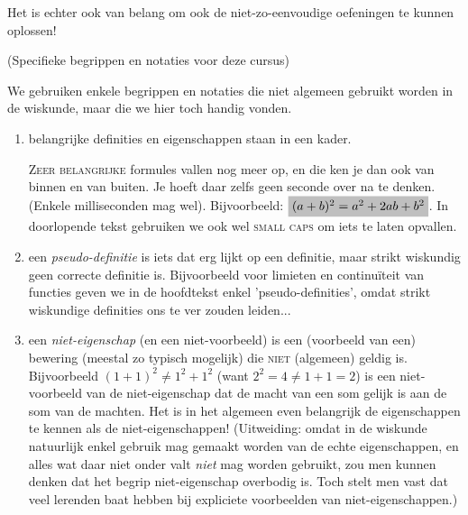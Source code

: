 \documentclass{ximera}
\begin{document}
\begin{remark}
\begin{enumerate}
		Het is echter ook van belang om ook de niet-zo-eenvoudige oefeningen te kunnen oplossen! 
		
	\end{enumerate}
\end{remark}

\begin{notation} (Specifieke begrippen en notaties voor deze cursus) 
	
	We gebruiken enkele begrippen en notaties die niet algemeen gebruikt worden in de wiskunde, maar die we hier toch handig vonden.
	\begin{enumerate}
		\item belangrijke definities en eigenschappen staan in een kader.
		
		 \textsc{Zeer belangrijke} formules vallen nog meer op, en die ken je dan ook van binnen en van buiten. Je hoeft daar zelfs geen seconde over na te denken. (Enkele milliseconden mag wel). Bijvoorbeeld: $\important{(a+b)^2 = a^2 + 2ab + b^2}$. In doorlopende tekst gebruiken we ook wel \textsc{small caps} om iets te laten opvallen.
		\item een \textit{pseudo-definitie} is iets dat erg lijkt op een definitie, maar strikt wiskundig geen correcte definitie is. Bijvoorbeeld voor limieten en continuïteit van functies geven we in de hoofdtekst enkel 'pseudo-definities', omdat strikt wiskundige definities ons te ver zouden leiden...
		\item een \textit{niet-eigenschap} (en een niet-voorbeeld) is een (voorbeeld van een) bewering (meestal zo typisch mogelijk) die \textsc{niet} (algemeen) geldig is. Bijvoorbeeld $(1+1)^2 \neq 1^2+1^2$ (want $2^2 = 4 \neq 1 + 1 = 2$) is een niet-voorbeeld van de niet-eigenschap dat de macht van een som gelijk is aan de som van de machten. Het is in het algemeen even belangrijk de eigenschappen te kennen als de niet-eigenschappen! (Uitweiding: omdat in de wiskunde natuurlijk enkel gebruik mag gemaakt worden van de echte eigenschappen, en alles wat daar niet onder valt \textit{niet} mag worden gebruikt, zou men kunnen denken dat het begrip niet-eigenschap overbodig is. Toch stelt men vast dat veel lerenden baat hebben bij expliciete voorbeelden van niet-eigenschappen.)
	\end{enumerate}
\end{notation}
\end{document}
